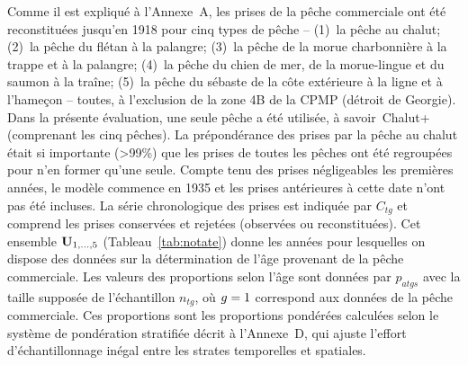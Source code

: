 \documentclass[11pt]{book}
\newcommand{\angL}{\guillemotleft\,}
\newcommand{\angR}{\,\guillemotright}
\newcommand{\pc}{\%}
\newcommand{\AppCat}{Annexe~A}
\newcommand{\AppBio}{Annexe~D}
\begin{document}
Comme il est expliqu\'{e} \`{a} l'\AppCat, les prises de la p\^{e}che commerciale ont \'{e}t\'{e} reconstitu\'{e}es jusqu'en 1918 pour cinq types de p\^{e}che -- (1)~la p\^{e}che au chalut; (2)~la p\^{e}che du fl\'{e}tan \`{a} la palangre; (3)~la p\^{e}che de la morue charbonni\`{e}re \`{a} la trappe et \`{a} la palangre; (4)~la p\^{e}che du chien de mer, de la morue-lingue et du saumon \`{a} la tra\^{i}ne; (5)~la p\^{e}che du s\'{e}baste de la c\^{o}te ext\'{e}rieure \`{a} la ligne et \`{a} l'hame\c{c}on -- toutes, \`{a} l'exclusion de la zone 4B de la CPMP (d\'{e}troit de Georgie).
Dans la pr\'{e}sente \'{e}valuation, une seule p\^{e}che a \'{e}t\'{e} utilis\'{e}e, \`{a} savoir \angL Chalut+\angR{} (comprenant les cinq p\^{e}ches).
La pr\'{e}pond\'{e}rance des prises par la p\^{e}che au chalut \'{e}tait si importante (>99\pc) que les prises de toutes les p\^{e}ches ont \'{e}t\'{e} regroup\'{e}es pour n'en former qu'une seule.
Compte tenu des prises n\'{e}gligeables les premi\`{e}res ann\'{e}es, le mod\`{e}le commence en 1935 et les prises ant\'{e}rieures \`{a} cette date n'ont pas \'{e}t\'{e} incluses.
La s\'{e}rie chronologique des prises est indiqu\'{e}e par $C_{tg}$ et comprend les prises conserv\'{e}es et rejet\'{e}es (observ\'{e}es ou reconstitu\'{e}es).
Cet ensemble ${\bf U}_{1,...,5}$ (Tableau~\ref{tab:notate}) donne les ann\'{e}es pour lesquelles on dispose des donn\'{e}es sur la d\'{e}termination de l'\^{a}ge provenant de la p\^{e}che commerciale.
Les valeurs des proportions selon l'\^{a}ge sont donn\'{e}es par $p_{atgs}$ avec la taille suppos\'{e}e de l'\'{e}chantillon $n_{tg}$, o\`{u} $g = 1$ correspond aux donn\'{e}es de la p\^{e}che commerciale.
Ces proportions sont les proportions pond\'{e}r\'{e}es calcul\'{e}es selon le syst\`{e}me de pond\'{e}ration stratifi\'{e}e d\'{e}crit \`{a} l'\AppBio, qui ajuste l'effort d'\'{e}chantillonnage in\'{e}gal entre les strates temporelles et spatiales.
\end{document}
